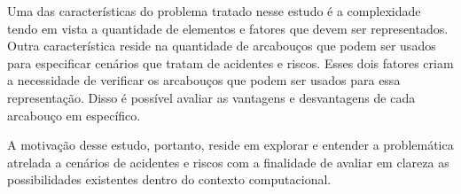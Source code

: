 Uma das características do problema tratado nesse estudo é a complexidade tendo em vista a quantidade de elementos e fatores que devem ser representados. Outra característica reside na quantidade de  arcabouços que podem ser usados para especificar cenários que tratam de acidentes e riscos. Esses dois fatores criam a necessidade de verificar os arcabouços que podem ser usados para essa representação. Disso é possível avaliar as vantagens e desvantagens de cada arcabouço em específico. 

A motivação desse estudo, portanto, reside em explorar e entender a problemática atrelada a cenários de acidentes e riscos com a finalidade de avaliar em clareza as possibilidades existentes dentro do contexto computacional.